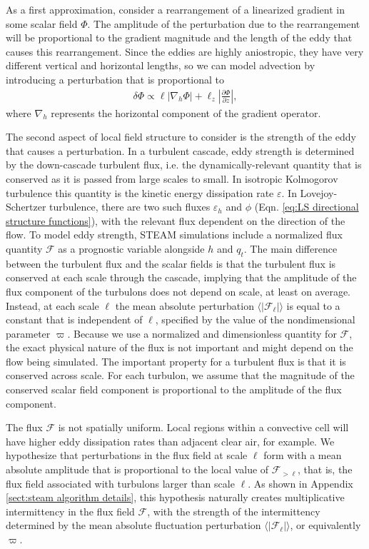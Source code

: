 \documentclass[acp, manuscript, english]{copernicus}
\begin{document}
As a first approximation, consider a rearrangement of a linearized gradient in some scalar field $\Phi$. The amplitude of the perturbation due to the rearrangement will be proportional to the gradient magnitude and the length of the eddy that causes this rearrangement. Since the eddies are highly aniostropic, they have very different vertical and horizontal lengths, so we can model advection by introducing a perturbation that is proportional to 
\begin{align}
  \delta \Phi \propto \ell\left|\nabla_h \Phi\right| + \ell_z\left|\frac{\partial \Phi}{\partial z}\right|, \label{eq:anisotropic gradient weighing}
\end{align}
where $\nabla_h$ represents the horizontal component of the gradient operator.

The second aspect of local field structure to consider is the strength of the eddy that causes a perturbation. In a turbulent cascade, eddy strength is determined by the down-cascade turbulent flux, i.e. the dynamically-relevant quantity that is conserved as it is passed from large scales to small. In isotropic Kolmogorov turbulence this quantity is the kinetic energy dissipation rate $\varepsilon$. In Lovejoy-Schertzer turbulence, there are two such fluxes $\varepsilon_h$ and $\phi$ (Eqn. \ref{eq:LS directional structure functions}), with the relevant flux dependent on the direction of the flow. To model eddy strength, STEAM simulations include a normalized flux quantity $\mathcal{F}$ as a prognostic variable alongside $h$ and $q_t$. The main difference between the turbulent flux and the scalar fields is that the turbulent flux is conserved at each scale through the cascade, implying that the amplitude of the flux component of the turbulons does not depend on scale, at least on average. Instead, at each scale $\ell$ the mean absolute perturbation $\langle |\mathcal{F}_\ell |\rangle$ is equal to a constant that is independent of $\ell$, specified by the value of the nondimensional parameter $\varpi$. Because we use a normalized and dimensionless quantity for $\mathcal{F}$, the exact physical nature of the flux is not important and might depend on the flow being simulated. The important property for a turbulent flux is that it is conserved across scale. For each turbulon, we assume that the magnitude of the conserved scalar field component is proportional to the amplitude of the flux component.

The flux $\mathcal{F}$ is not spatially uniform. Local regions within a convective cell will have higher eddy dissipation rates than adjacent clear air, for example. We hypothesize that perturbations in the flux field at scale $\ell$ form with a mean absolute amplitude that is proportional to the local value of $\mathcal{F}_{>\ell}$, that is, the flux field associated with turbulons larger than scale $\ell$. As shown in Appendix \ref{sect:steam algorithm details}, this hypothesis naturally creates multiplicative intermittency in the flux field $\mathcal{F}$, with the strength of the intermittency determined by the mean absolute fluctuation perturbation $\langle |\mathcal{F}_\ell |\rangle$, or equivalently $\varpi$.
\end{document}
